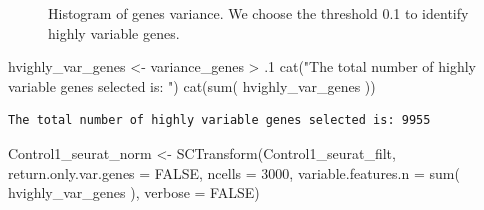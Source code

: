 \documentclass[
  letterpaper,
  DIV=11,
  numbers=noendperiod]{scrartcl}
\newenvironment{Shaded}{\begin{snugshade}}{\end{snugshade}}
\newcommand{\AttributeTok}[1]{\textcolor[rgb]{0.40,0.45,0.13}{#1}}
\newcommand{\ConstantTok}[1]{\textcolor[rgb]{0.56,0.35,0.01}{#1}}
\newcommand{\DecValTok}[1]{\textcolor[rgb]{0.68,0.00,0.00}{#1}}
\newcommand{\FunctionTok}[1]{\textcolor[rgb]{0.28,0.35,0.67}{#1}}
\newcommand{\NormalTok}[1]{\textcolor[rgb]{0.00,0.23,0.31}{#1}}
\newcommand{\OtherTok}[1]{\textcolor[rgb]{0.00,0.23,0.31}{#1}}
\newcommand{\SpecialCharTok}[1]{\textcolor[rgb]{0.37,0.37,0.37}{#1}}
\newcommand{\StringTok}[1]{\textcolor[rgb]{0.13,0.47,0.30}{#1}}
\begin{document}
\begin{figure}[H]


\caption{\label{fig-hvg}Histogram of genes variance. We choose the
threshold 0.1 to identify highly variable genes.}

\end{figure}%

\begin{Shaded}
\begin{Highlighting}[]
\NormalTok{hvighly\_var\_genes }\OtherTok{\textless{}{-}}\NormalTok{ variance\_genes }\SpecialCharTok{\textgreater{}}\NormalTok{ .}\DecValTok{1}
\FunctionTok{cat}\NormalTok{(}\StringTok{"The total number of highly variable genes selected is: "}\NormalTok{)}
\FunctionTok{cat}\NormalTok{(}\FunctionTok{sum}\NormalTok{( hvighly\_var\_genes ))}
\end{Highlighting}
\end{Shaded}

\begin{verbatim}
The total number of highly variable genes selected is: 9955
\end{verbatim}

\begin{Shaded}
\begin{Highlighting}[]
\NormalTok{Control1\_seurat\_norm }\OtherTok{\textless{}{-}} \FunctionTok{SCTransform}\NormalTok{(Control1\_seurat\_filt, }
                                             \AttributeTok{return.only.var.genes =} \ConstantTok{FALSE}\NormalTok{, }
                                             \AttributeTok{ncells =} \DecValTok{3000}\NormalTok{, }
                                             \AttributeTok{variable.features.n =} \FunctionTok{sum}\NormalTok{( hvighly\_var\_genes ),}
                                             \AttributeTok{verbose =} \ConstantTok{FALSE}\NormalTok{)}
\end{Highlighting}
\end{Shaded}
\end{document}
